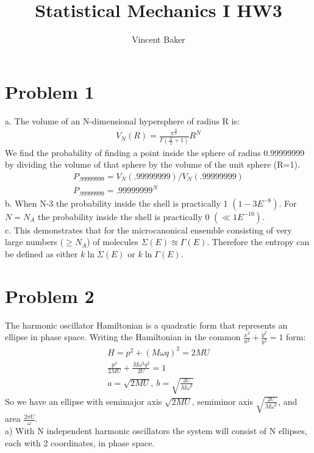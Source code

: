 \documentclass[a4paper,12pt]{article}
\title{Statistical Mechanics I HW3}
\author{Vincent Baker}
\numberwithin{equation}{section}
\begin{document}
\maketitle

\section{Problem 1}
a. The volume of an N-dimensional hypersphere of radius R is:
\begin{gather}
 V_N(R)=\frac{\pi^{\frac{N}{2}}}{\Gamma(\frac{N}{2}+1)}R^N
\end{gather}
We find the probability of finding a point inside the sphere of radius 0.99999999 by dividing the volume of that sphere by the volume of the unit sphere (R=1).
\begin{gather}
 P_{.99999999}= V_N(.99999999)/V_N(.99999999)\\
 P_{.99999999}= .99999999^N
\end{gather}
b. When N-3 the probability inside the shell is practically 1 $(1-3E^{-8})$.
For $N=N_A$ the probability inside the shell is practically 0 $(\ll 1E^{-10})$.
\\
c. This demonstrates that for the microcanonical ensemble consisting of very large numbers ($\ge N_A$) of molecules $\Sigma (E) \approxeq \Gamma (E)$.
Therefore the entropy can be defined as either $k \ln{\Sigma (E)}$ or $k \ln{\Gamma (E)}$.

\section{Problem 2}
The harmonic oscillator Hamiltonian is a quadratic form that represents an ellipse in phase space.
Writing the Hamiltonian in the common $\frac{x^2}{a^2}+\frac{y^2}{b^2}=1$ form:
\begin{gather}
 H=p^2+(M\omega q)^2=2MU\\
 \frac{p^2}{2MU}+\frac{M\omega^2q^2}{2U}=1\\
 a=\sqrt{2MU},\ b=\sqrt{\frac{2U}{M\omega^2}}
\end{gather}
So we have an ellipse with semimajor axis $\sqrt{2MU}$, semiminor axis $\sqrt{\frac{2U}{M\omega^2}}$, and area $\frac{2\pi U}{\omega}$.
\\
a) With N independent harmonic oscillators the system will consist of N ellipses, each with 2 coordinates, in phase space. 
\end{document}
